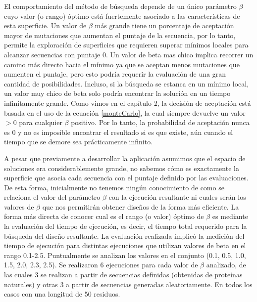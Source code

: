 El comportamiento del método de búsqueda depende de un único parámetro $\beta$ cuyo valor (o rango) óptimo está fuertemente asociado a las características de esta superficie.
Un valor de $\beta$ más grande tiene un porcentaje de aceptación mayor de mutaciones que aumentan el puntaje de la secuencia, por lo tanto, permite la exploración de superficies que 
requieren superar mínimos locales para alcanzar secuencias con puntaje 0.
Un valor de beta mas chico implica recorrer un camino más directo hacia el mínimo ya que se aceptan menos mutaciones que aumenten el puntaje, pero esto podría requerir la evaluación de una gran cantidad de posibilidades. 
Incluso, si la búsqueda se estanca en un mínimo local, un valor muy chico de beta solo podría encontrar la solución en un tiempo infinitamente 
grande. Como vimos en el capítulo 2, la decisión de aceptación está basada en el uso de la ecuación \ref{monteCarlo}, la cual siempre devuelve un valor $>0$ para cualquier $\beta$ positivo.
Por lo tanto, la probabilidad de aceptación nunca es 0 y no es imposible encontrar el resultado si es que existe, aún cuando el tiempo que se demore sea prácticamente infinito.


A pesar que previamente a desarrollar la aplicación asumimos que el espacio de soluciones era considerablemente grande, no sabemos cómo es exactamente 
la superficie que asocia cada secuencia con el puntaje definido por las evaluaciones. 
De esta forma, inicialmente no tenemos ningún conocimiento de como se relaciona el valor del parámetro $\beta$ con la ejecución
resultante ni cuales serán los valores de $\beta$ que nos permitirán obtener diseños de la forma más eficiente.
La forma más directa de conocer cual es el rango (o valor) óptimo de $\beta$ es mediante la evaluación del tiempo de ejecución, es decir, el tiempo total requerido para la búsqueda del diseño resultante. 
La evaluación realizada implicó la medición del tiempo de ejecución para distintas ejecuciones que utilizan valores de beta en el rango 0.1-2.5.
Puntualmente se analizan los valores en el conjunto (0.1, 0.5, 1.0, 1.5, 2.0, 2.3, 2.5). 
Se realizaron 6 ejecuciones para cada valor de $\beta$ analizado, de las cuales 3 se realizan a partir de secuencias definidas (obtenidas de proteínas naturales) y otras 3 a partir de secuencias generadas aleatoriamente.
En todos los casos con una longitud de 50 residuos.

